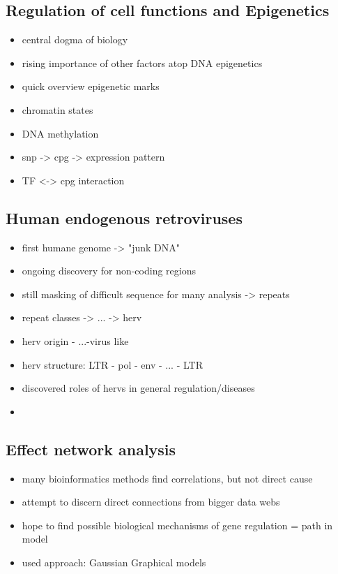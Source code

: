 \documentclass[a4paper,12pt]{article}
\begin{document}
\subsection{Regulation of cell functions and Epigenetics}
\begin{itemize}
\item central dogma of biology
\item rising importance of other factors atop DNA \textrightarrow epigenetics
\item quick overview epigenetic marks
\item chromatin states
\item DNA methylation 
\item snp -> cpg -> expression pattern
\item TF <-> cpg interaction
\end{itemize}


\subsection{Human endogenous retroviruses}
\begin{itemize}
\item first humane genome -> "junk DNA"
\item ongoing discovery for non-coding regions
\item still masking of difficult sequence for many analysis -> repeats
\item repeat classes -> ... -> herv
\item herv origin - ...-virus like 
\item herv structure: LTR - pol - env - ... - LTR
\item discovered roles of hervs in general regulation/diseases
\item 
\end{itemize}

\subsection{Effect network analysis}
\begin{itemize}
\item many bioinformatics methods find correlations, but not direct cause
\item attempt to discern direct connections from bigger data webs
\item hope to find possible biological mechanisms of gene regulation = path in model
\item used approach: Gaussian Graphical models
\end{itemize}
\end{document}
